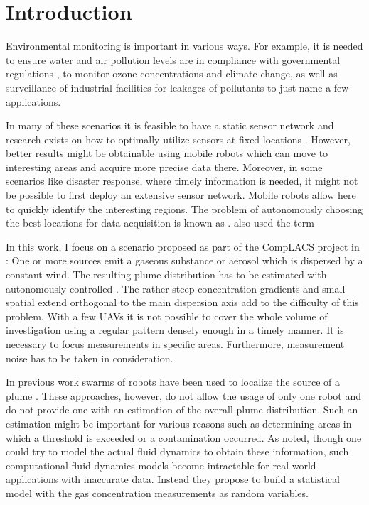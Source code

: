 \chapter{Introduction}
Environmental monitoring is important in various ways.
For example, it is needed to ensure water and air pollution levels are in
compliance with governmental regulations \parencite[i.\,e.][]{Anonymous:1996ui}, 
to monitor ozone concentrations and climate change,  as well as surveillance of 
industrial facilities for leakages of pollutants to just name a few 
applications.

In many of these scenarios it is feasible to have a static sensor network and
research exists on how to optimally utilize sensors at fixed locations
\parencite[e.\,g.][]{Osborne:2008hi, Guestrin:2005cq, Wang:kz}.  However, better
results might be obtainable using mobile robots which can move to interesting
areas and acquire more precise data there. Moreover, in some scenarios like
disaster response, where timely information is needed, it might not be possible
to first deploy an extensive sensor network. Mobile robots allow here to quickly
identify the interesting regions. The problem of autonomously choosing the
best locations for data acquisition is known as . \textcite{Marchant:2012wb} also used the term 

In this work, I focus on a scenario proposed as part of the CompLACS project in 
\textcite{denardi2013rn}: One or more sources emit a gaseous substance or 
aerosol which is dispersed by a constant wind. The resulting plume distribution 
has to be estimated with autonomously controlled . The rather steep concentration gradients and small spatial 
extend orthogonal to the main dispersion axis add to the difficulty of this 
problem.  With a few UAVs it is not possible to cover the whole volume of 
investigation using a regular pattern densely enough in a timely manner.  It is 
necessary to focus measurements in specific areas.  Furthermore, measurement 
noise has to be taken in consideration.

In previous work swarms of robots have been used to localize the source of 
a plume \parencite{Jatmiko:2007df, Zarzhitsky:2005tz}. These approaches, 
however, do not allow the usage of only one robot and do not provide one with an 
estimation of the overall plume distribution. Such an estimation might be 
important for various reasons such as determining areas in which a threshold is 
exceeded or a contamination occurred. As \textcite{Reggente:2009ti} noted, 
though one could try to model the actual fluid dynamics to obtain these 
information, such computational fluid dynamics models become intractable for 
real world applications with inaccurate data.  Instead they propose to build 
a statistical model with the gas concentration measurements as random variables.

